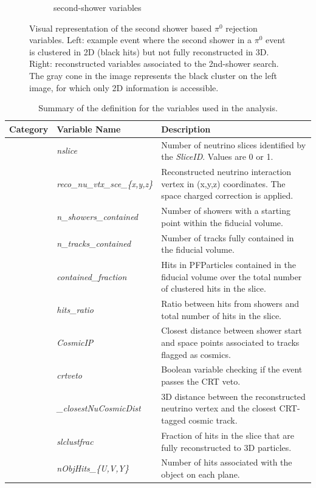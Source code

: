 \begin{figure}[H]
\begin{center}
\begin{subfigure}[b]{0.35\textwidth}
    \caption{\label{fig:nue:variables:secondshower}second-shower variables }
    \end{subfigure}
\caption{\label{fig:nue:variables:secondshower} Visual representation of the second shower based $\pi^0$ rejection variables. Left: example event where the second shower in a $\pi^0$ event is clustered in 2D (black hits) but not fully reconstructed in 3D. Right: reconstructed variables associated to the 2nd-shower search. The gray cone in the image represents the black cluster on the left image, for which only 2D information is accessible.}
\end{center}
\end{figure}

\begin{table}[ht]
\caption{\label{tab:variableSummary} Summary of the definition for the variables used in the analysis.}
\centering
\begin{tabular}{ m{} | m{} | m{}  }
Category & Variable Name & Description  \\
\hline

\multicolumn{1}{l|}{} & \emph{nslice} &  Number of neutrino slices identified by the \emph{SliceID}. Values are  0 or 1.\\  \cline{2-3}
\multicolumn{1}{l|}{} & \emph{reco\_nu\_vtx\_sce\_\{x,y,z\}} & Reconstructed neutrino interaction vertex in (x,y,z) coordinates. The space charged correction is applied.  \\  \cline{2-3}
\multicolumn{1}{l|}{} & \emph{n\_showers\_contained} & Number of showers with a starting point within the fiducial volume. \\  \cline{2-3}
\multicolumn{1}{l|}{} & \emph{n\_tracks\_contained} & Number of tracks fully contained in the fiducial volume.  \\  \cline{2-3}
\multicolumn{1}{l|}{} & \emph{contained\_fraction} & Hits in PFParticles contained in the fiducial volume over the total number of clustered hits in the slice.  \\  \cline{2-3}
\parbox[t]{2mm}{} & \emph{hits\_ratio} & Ratio between hits from showers and total number of hits in the slice. \\  
 & \emph{CosmicIP} & Closest distance between shower start and space points associated to tracks flagged as cosmics. \\  
 & \emph{crtveto} & Boolean variable checking if the event passes the CRT veto. \\  
 & \emph{\_closestNuCosmicDist} &  3D distance between the reconstructed neutrino vertex and the closest CRT-tagged cosmic track. \\  
 & \emph{slclustfrac} & Fraction of hits in the slice that are fully reconstructed to 3D particles. \\  
 & \emph{nObjHits\_\{U,V,Y\}} & Number of hits associated with the object on each plane.\\  
\hline


\end{tabular}
\end{table}
